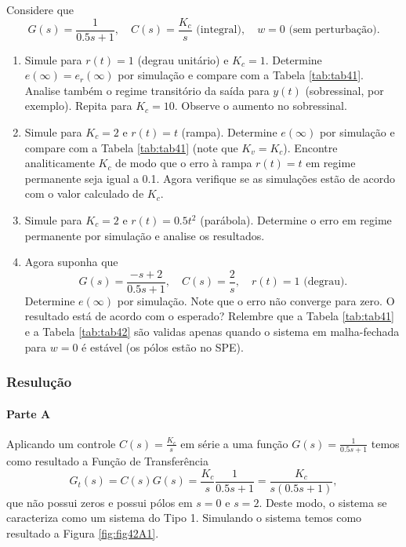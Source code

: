 \documentclass[
]{book}
\providecommand{\tightlist}{%
  \setlength{\itemsep}{0pt}\setlength{\parskip}{0pt}}
\theoremstyle{definition}
\theoremstyle{definition}
\theoremstyle{definition}
\theoremstyle{remark}
\begin{document}
Considere que
\[
G(s) = \frac {1}{0.5s+1}, \quad C(s) = \frac{K_c}{s} \text{ (integral)}, \quad w=0 \text{ (sem perturbação).}
\]

\begin{enumerate}
\def\labelenumi{\alph{enumi}.}
\tightlist
\item
  Simule para \(r(t) = 1\) (degrau unitário) e \(K_c = 1\). Determine \(e(\infty) = e_r(\infty)\) por simulação e compare com a Tabela \ref{tab:tab41}. Analise também o regime transitório da saída para \(y(t)\) (sobressinal, por exemplo). Repita para \(K_c = 10\). Observe o aumento no sobressinal.
\item
  Simule para \(K_c = 2\) e \(r(t) = t\) (rampa). Determine \(e(\infty)\) por simulação e compare com a Tabela \ref{tab:tab41} (note que \(K_v = K_c\)). Encontre analiticamente \(K_c\) de modo que o erro à rampa \(r(t) = t\) em regime permanente seja igual a 0.1. Agora verifique se as simulações estão de acordo com o valor calculado de \(K_c\).
\item
  Simule para \(K_c = 2\) e \(r(t) = 0.5t^2\) (parábola). Determine o erro em regime permanente por simulação e analise os resultados.
\item
  Agora suponha que
  \[
  G(s) = \frac {-s+2}{0.5s+1}, \quad C(s)= \frac{2}{s}, \quad r(t) = 1 \text{ (degrau).}
  \]
  Determine \(e(\infty)\) por simulação. Note que o erro não converge para zero. O resultado está de acordo com o esperado? Relembre que a Tabela \ref{tab:tab41} e a Tabela \ref{tab:tab42} são validas apenas quando o sistema em malha-fechada para \(w=0\) é estável (os pólos estão no SPE).
\end{enumerate}

\hypertarget{resuluuxe7uxe3o}{%
\subsubsection*{Resulução}\label{resuluuxe7uxe3o}}

\hypertarget{parte-a-2}{%
\paragraph{Parte A}\label{parte-a-2}}

Aplicando um controle \(C(s) = \frac {K_c}{s}\) em série a uma função \(G(s) = \frac {1}{0.5s+1}\) temos como resultado a Função de Transferência\\
\[
G_t(s) = C(s)G(s) = \frac {K_c}{s} \frac{1}{0.5s+1} = \frac {K_c}{s(0.5s+1)},
\]
que não possui zeros e possui pólos em \(s = 0\) e \(s = 2\). Deste modo, o sistema se caracteriza como um sistema do Tipo 1. Simulando o sistema temos como resultado a Figura \ref{fig:fig42A1}.
\end{document}
